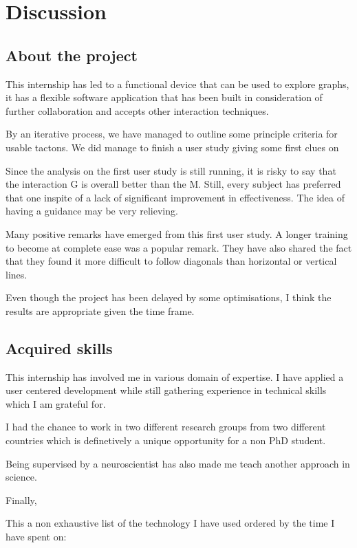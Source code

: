 \chapter{Discussion}

\section{About the project}\label{about-the-project}

This internship has led to a functional device that can be used to explore graphs, it has a flexible software application that has been built in consideration of further collaboration and accepts other interaction techniques.

By an iterative process, we have managed to outline some principle criteria for usable tactons. We did manage to finish a user study giving some first clues on 

Since the analysis on the first user study is still running, it is risky to say that the interaction G is overall better than the M. Still, every subject has preferred that one inspite of a lack of significant improvement in effectiveness. The idea of having a guidance may be very relieving.

Many positive remarks have emerged from this first user study. A longer training to become at complete ease was a popular remark. They have also shared the fact that they found it more difficult to follow diagonals than horizontal or vertical lines. 

Even though the project has been delayed by some optimisations, I think the results are appropriate given the time frame.


\section{Acquired skills}\label{acquired-skills}

This internship has involved me in various domain of expertise. I have applied a user centered development while still gathering experience in technical skills which I am grateful for.

I had the chance to work in two different research groups from two different countries which is definetively a unique opportunity for a non PhD student.

Being supervised by a neuroscientist has also made me teach another approach in science.

Finally, 

This a non exhaustive list of the technology I have used ordered by the time I have spent on:

